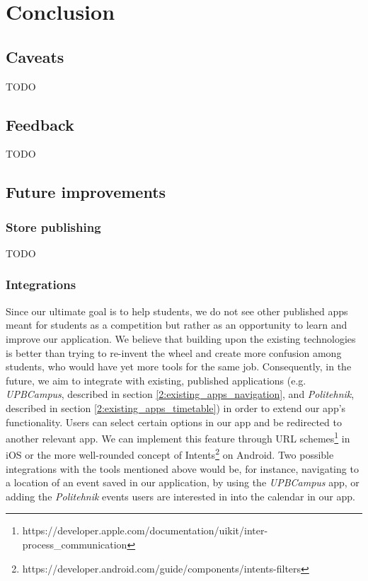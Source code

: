 \chapter{Conclusion} \label{chapter6}

\section{Caveats} \label{6:caveats}
TODO

\section{Feedback} \label{6:feedback}
TODO %

\section{Future improvements} \label{6:future}
    \subsection{Store publishing} \label{6:future_publish}
    TODO %
    
    \subsection{Integrations} \label{6:future_integrations}

    Since our ultimate goal is to help students, we do not see other published apps meant for students as a competition but rather as an opportunity to learn and improve our application. We believe that building upon the existing technologies is better than trying to re-invent the wheel and create more confusion among students, who would have yet more tools for the same job.  Consequently, in the future, we aim to integrate with existing, published applications (e.g. \textit{UPBCampus}, described in section \ref{2:existing_apps_navigation}, and \textit{Politehnik}, described in section \ref{2:existing_apps_timetable}) in order to extend our app's functionality. Users can select certain options in our app and be redirected to another relevant app. We can implement this feature through URL schemes\footnote{https://developer.apple.com/documentation/uikit/inter-process\_communication} in iOS or the more well-rounded concept of Intents\footnote{https://developer.android.com/guide/components/intents-filters} on Android. Two possible integrations with the tools mentioned above would be, for instance, navigating to a location of an event saved in our application, by using the \textit{UPBCampus} app, or adding the \textit{Politehnik} events users are interested in into the calendar in our app.
    
